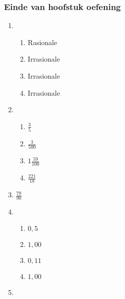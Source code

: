 {\begin{multicols}{3}
\subsubsection*{Einde van hoofstuk oefening} %


\begin{enumerate}[noitemsep, label=\textbf{\arabic*}. ] 
\item%
    \begin{enumerate}[noitemsep, label=\textbf{(\alph*)} ] 
    \item Rasionale%
    \item Irrasionale%
    \item Irrasionale%
    \item Irrasionale%
    \end{enumerate}
\item %
    \begin{enumerate}[noitemsep, label=\textbf{(\alph*)} ] 
    \item $\frac{3}{5}$%
    \item $\frac{3}{500}$%
    \item $1\frac{59}{100}$%
    \item $\frac{221}{18}$%
    \end{enumerate}
\setcounter{enumi}{3}
\item $\frac{78}{90}$%


\item %
    \begin{enumerate}[noitemsep, label=\textbf{(\alph*)} ]  
    \item $0,5$%
    \item $1,00$%
    \item $0,11$%
    \item $1,00$%
    \end{enumerate}

\item %


\end{enumerate}
\end{multicols}}
